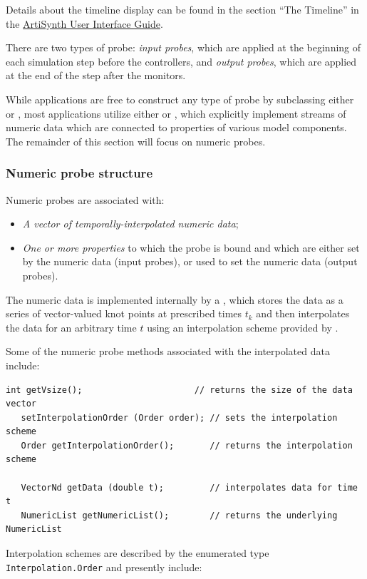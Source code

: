 Details about the timeline display can be found in
the section ``The Timeline'' in the
\href{../uiguide/uiguide.html}{
ArtiSynth User Interface Guide}.

There are two types of probe: {\it input probes}, which are applied at
the beginning of each simulation step before the controllers, and {\it
output probes}, which are applied at the end of the step after the
monitors.

While applications are free to construct any type of probe by
subclassing either  or
, most applications
utilize either  or
, which
explicitly implement streams of numeric data which are connected to
properties of various model components.  The remainder of this section
will focus on numeric probes.

\subsubsection{Numeric probe structure}
\label{NumericProbeStructure:sec}

Numeric probes are associated with:

\begin{itemize}

\item {\it A vector of temporally-interpolated numeric data};

\item {\it One or more properties} to which the probe is bound and
which are either set by the numeric data (input probes), or used to
set the numeric data (output probes).

\end{itemize}

The numeric data is implemented internally by a
, which stores the data
as a series of vector-valued knot points at prescribed times $t_k$ and
then interpolates the data for an arbitrary time $t$ using an
interpolation scheme provided by
.

Some of the numeric probe methods associated with the interpolated
data include:
%
\begin{lstlisting}[]
   int getVsize();                      // returns the size of the data vector
   setInterpolationOrder (Order order); // sets the interpolation scheme
   Order getInterpolationOrder();       // returns the interpolation scheme

   VectorNd getData (double t);         // interpolates data for time t
   NumericList getNumericList();        // returns the underlying NumericList
\end{lstlisting}
%
Interpolation schemes are described by the enumerated type {\tt
Interpolation.Order} and presently include:

